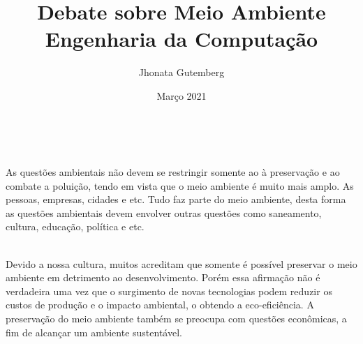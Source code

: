 \documentclass[a4paper, 12pt]{article}
\title{
    Debate sobre Meio Ambiente \\
    \large Engenharia da Computação
}
\author{
    Jhonata Gutemberg
}
\date{Março 2021}
\begin{document}
    \maketitle

    \noindent{} \\

    \par As questões ambientais não devem se restringir somente ao à preservação e ao combate a poluição, tendo em vista que o meio ambiente é muito mais amplo. As pessoas, empresas, cidades e etc. Tudo faz parte do meio ambiente, desta forma as questões ambientais devem envolver outras questões como saneamento, cultura, educação, política e etc. \\

    \noindent{} \\

    \par Devido a nossa cultura, muitos acreditam que somente é possível preservar o meio ambiente em detrimento ao desenvolvimento. Porém essa afirmação não é verdadeira uma vez que o surgimento de novas tecnologias podem reduzir os custos de produção e o impacto ambiental, o obtendo a eco-eficiência. A preservação do meio ambiente também se preocupa com questões econômicas, a fim de alcançar um ambiente sustentável.
\end{document}
